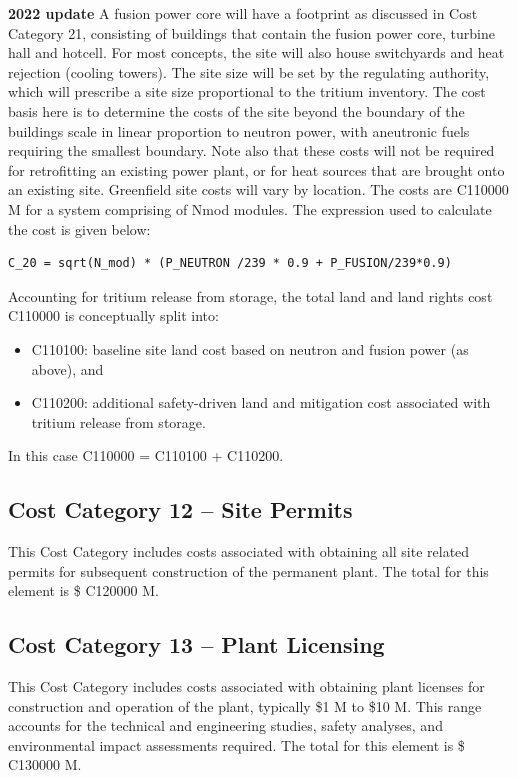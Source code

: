 \textbf{2022 update}
A fusion power core will have a footprint as discussed in Cost Category 21, consisting of buildings that contain the fusion power core, turbine hall and hotcell. For most concepts, the site will also house switchyards and heat rejection (cooling towers). The site size will be set by the regulating authority, which will prescribe a site size proportional to the tritium inventory.  The cost basis here is to determine the costs of the site beyond the boundary of the buildings scale in linear proportion to neutron power, with aneutronic fuels requiring the smallest boundary.  Note also that these costs will not be required for retrofitting an existing power plant, or for heat sources that are brought onto an existing site.  Greenfield site costs will vary by location. The costs are C110000 M for a system comprising of Nmod modules.
The expression used to calculate the cost is given below:
\begin{verbatim} 
C_20 = sqrt(N_mod) * (P_NEUTRON /239 * 0.9 + P_FUSION/239*0.9)\end{verbatim}

\ifsafetycosts
Accounting for tritium release from storage, the total land and land rights cost C110000 is conceptually split into:
\begin{itemize}
  \item C110100: baseline site land cost based on neutron and fusion power (as above), and
  \item C110200: additional safety-driven land and mitigation cost associated with tritium release from storage.
\end{itemize}
In this case C110000 = C110100 + C110200.
\fi


\subsection*{Cost Category 12 – Site Permits}
This Cost Category includes costs associated with obtaining all site related permits for subsequent construction of the permanent plant.  The total for this element is \$ C120000 M.

\subsection*{Cost Category 13 – Plant Licensing}
This Cost Category includes costs associated with obtaining plant licenses for construction and operation of the plant, typically \$1 M to \$10 M. This range accounts for the technical and engineering studies, safety analyses, and environmental impact assessments required.  The total for this element is \$ C130000 M.

